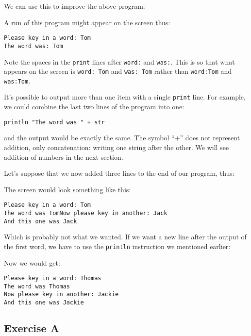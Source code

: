 We can use this to improve the above program:


A run of this program might appear on the screen thus:
\begin{Verbatim}
Please key in a word: Tom
The word was: Tom
\end{Verbatim}

Note the spaces in the \verb!print! lines after \verb!word:! and \verb!was:!.
This is so that what appears on the screen is \verb!word: Tom! and
\verb!was: Tom! rather than \verb!word:Tom! and \verb!was:Tom!.

It's possible to output more than one item with a single \verb!print! line.
For example, we could combine the last two lines of the program into one:

\begin{Verbatim}
println "The word was " + str
\end{Verbatim}

and the output would be exactly the same. The symbol ``+'' does not
represent addition, only concatenation: writing one string after the
other. We will see addition of numbers in the next section.

Let's suppose that we now added three lines to the end of our program, thus:


The screen would look something like this:
\begin{Verbatim}
Please key in a word: Tom
The word was TomNow please key in another: Jack
And this one was Jack
\end{Verbatim}

Which is probably not what we wanted.  If we want a new line after the
output of the first word, we have to use the \verb!println! instruction we mentioned earlier:


Now we would get:
\begin{Verbatim}
Please key in a word: Thomas
The word was Thomas
Now please key in another: Jackie
And this one was Jackie
\end{Verbatim}


\subsection*{Exercise A}

